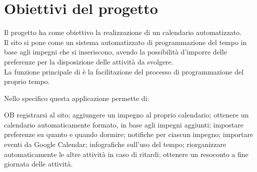 \section{Obiettivi del progetto}
\label{sec:ObiettiviProgetto}
Il progetto ha come obiettivo la realizzazione di un calendario automatizzato.\\
Il sito si pone come un sistema automatizzato di programmazione del tempo in base agli impegni che si inseriscono, avendo la possibilità d'imporre delle preferenze per la disposizione delle attività da svolgere.\\
La funzione principale di \nome è la facilitazione del processo di programmazione del proprio tempo.

\vspace{0.5cm}

Nello specifico questa applicazione permette di:
\begin {obiettiviList} {OB} 
       registrarsi al sito;
       aggiungere un impegno al proprio calendario;
       ottenere un calendario automaticamente formato, in base agli impegni aggiunti; 
       impostare preferenze su quanto e quando dormire;
       notifiche per ciascun impegno; 
       importare eventi da Google Calendar; 
       infografiche sull'uso del tempo;
       riorganizzare automaticamente le altre attività in caso di ritardi;
       ottenere un resoconto a fine giornata delle attività.

\end{obiettiviList}
